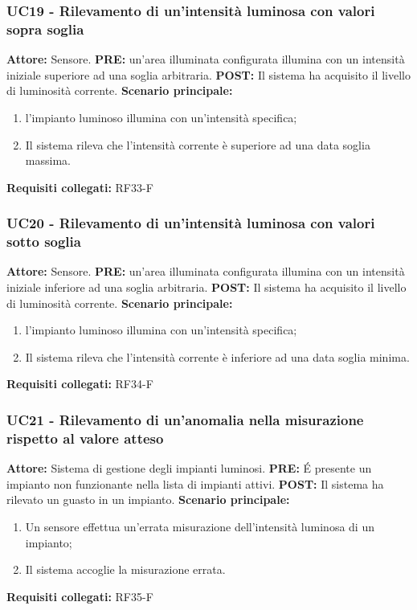 \documentclass[a4paper, 12pt]{article}
\begin{document}
\subsubsection{UC19 - Rilevamento di un'intensità luminosa con valori sopra soglia}
\textbf{Attore:} Sensore.\newline
\textbf{PRE:} un'area illuminata configurata illumina con un intensità iniziale superiore ad una soglia arbitraria.\newline
\textbf{POST:} Il sistema ha acquisito il livello di luminosità corrente. \newline
\textbf{Scenario principale:}
\begin{enumerate}
    \item l'impianto luminoso illumina con un'intensità specifica;
    \item Il sistema rileva che l'intensità corrente è superiore ad una data soglia massima.
\end{enumerate}
\textbf{Requisiti collegati:} RF33-F\newline

\subsubsection{UC20 - Rilevamento di un'intensità luminosa con valori sotto soglia}
\textbf{Attore:} Sensore.\newline
\textbf{PRE:} un'area illuminata configurata illumina con un intensità iniziale inferiore ad una soglia arbitraria.\newline
\textbf{POST:} Il sistema ha acquisito il livello di luminosità corrente. \newline
\textbf{Scenario principale:}
\begin{enumerate}
    \item l'impianto luminoso illumina con un'intensità specifica;
    \item Il sistema rileva che l'intensità corrente è inferiore ad una data soglia minima.
\end{enumerate}
\textbf{Requisiti collegati:} RF34-F\newline

\subsubsection{UC21 - Rilevamento di un'anomalia nella misurazione rispetto al valore atteso}
\textbf{Attore:} Sistema di gestione degli impianti luminosi.\newline
\textbf{PRE:} \'E presente un impianto non funzionante nella lista di impianti attivi.\newline
\textbf{POST:} Il sistema ha rilevato un guasto in un impianto. \newline
\textbf{Scenario principale:}
\begin{enumerate}
    \item Un sensore effettua un'errata misurazione dell'intensità luminosa di un impianto;
    \item Il sistema accoglie la misurazione errata.
\end{enumerate}
\textbf{Requisiti collegati:} RF35-F\newline
\end{document}
